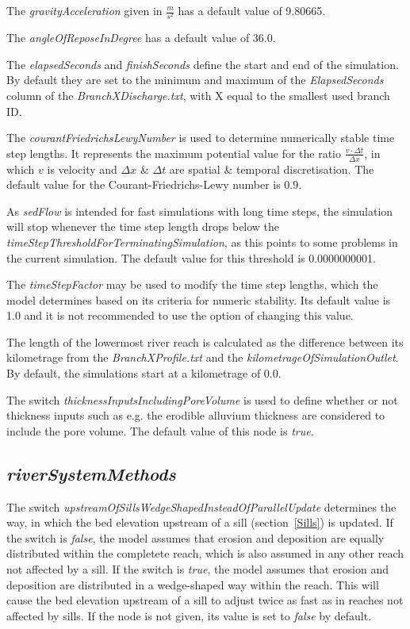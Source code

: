 \documentclass[11pt,a4paper]{article}
\begin{document}
The \emph{gravityAcceleration} given in $\frac{m}{s^2}$ has a default value of 9.80665.

The \emph{angleOfReposeInDegree} has a default value of 36.0.

The \emph{elapsedSeconds} and \emph{finishSeconds} define the start and end of the simulation. By default they are set to the minimum and maximum of the \emph{ElapsedSeconds} column of the \emph{BranchXDischarge.txt}, with X equal to the smallest used branch ID.

The \emph{courantFriedrichsLewyNumber} is used to determine numerically stable time step lengths. It represents the maximum potential value for the ratio $\frac{v \cdot \Delta{}t}{\Delta{}x}$, in which $v$ is velocity and $\Delta{}x$ \&{} $\Delta{}t$ are spatial \&{} temporal discretisation. The default value for the Courant-Friedrichs-Lewy number is 0.9.

As \emph{sedFlow} is intended for fast simulations with long time steps, the simulation will stop whenever the time step length drops below the \emph{timeStepThresholdForTerminatingSimulation}, as this points to some problems in the current simulation. The default value for this threshold is 0.0000000001.

The \emph{timeStepFactor} may be used to modify the time step lengths, which the model determines based on its criteria for numeric stability. Its default value is 1.0 and it is not recommended to use the option of changing this value.

The length of the lowermost river reach is calculated as the difference between its kilometrage from the \emph{BranchXProfile.txt} and the \emph{kilometrageOfSimulationOutlet}. By default, the simulations start at a kilometrage of 0.0.

The switch \emph{thicknessInputsIncludingPoreVolume} is used to define whether or not thickness inputs such as e.g. the erodible alluvium thickness are considered to include the pore volume. The default value of this node is \emph{true}.

\subsection{\emph{riverSystemMethods}}\label{RiverSystemMethods}

The switch \emph{upstreamOfSillsWedgeShapedInsteadOfParallelUpdate} determines the way, in which the bed elevation upstream of a sill (section~\ref{Sills}) is updated. If the switch is \emph{false}, the model assumes that erosion and deposition are equally distributed within the completete reach, which is also assumed in any other reach not affected by a sill. If the switch is \emph{true}, the model assumes that erosion and deposition are distributed in a wedge-shaped way within the reach. This will cause the bed elevation upstream of a sill to adjust twice as fast as in reaches not affected by sills. If the node is not given, its value is set to \emph{false} by default.
\end{document}
